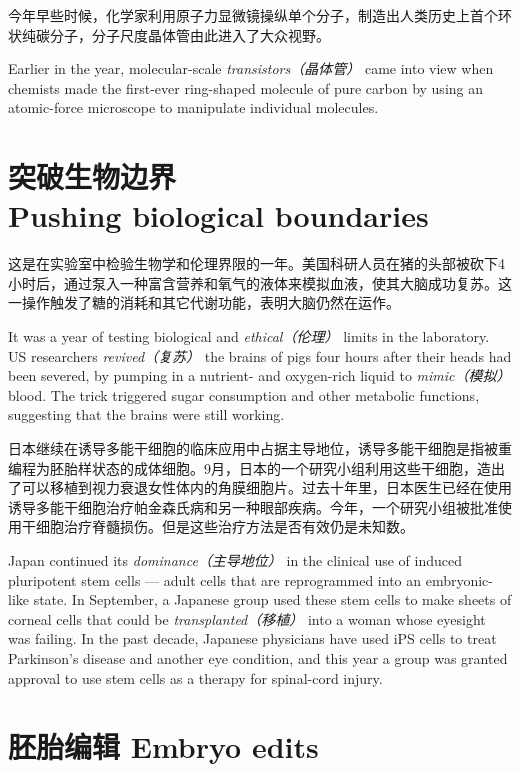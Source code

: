 \begin{multicols}{3}
今年早些时候，化学家利用原子力显微镜操纵单个分子，制造出人类历史上首个环状纯碳分子，分子尺度晶体管由此进入了大众视野。

Earlier in the year, molecular-scale \textit{transistors（晶体管）} came into view when chemists made the first-ever ring-shaped molecule of pure carbon by using an atomic-force microscope to manipulate individual molecules.


\section*{突破生物边界\\Pushing biological boundaries}

这是在实验室中检验生物学和伦理界限的一年。美国科研人员在猪的头部被砍下4小时后，通过泵入一种富含营养和氧气的液体来模拟血液，使其大脑成功复苏。这一操作触发了糖的消耗和其它代谢功能，表明大脑仍然在运作。

It was a year of testing biological and \textit{ethical（伦理）} limits in the laboratory. US researchers \textit{revived（复苏）} the brains of pigs four hours after their heads had been severed, by pumping in a nutrient- and oxygen-rich liquid to \textit{mimic（模拟）} blood. The trick triggered sugar consumption and other metabolic functions, suggesting that the brains were still working. 


日本继续在诱导多能干细胞的临床应用中占据主导地位，诱导多能干细胞是指被重编程为胚胎样状态的成体细胞。9月，日本的一个研究小组利用这些干细胞，造出了可以移植到视力衰退女性体内的角膜细胞片。过去十年里，日本医生已经在使用诱导多能干细胞治疗帕金森氏病和另一种眼部疾病。今年，一个研究小组被批准使用干细胞治疗脊髓损伤。但是这些治疗方法是否有效仍是未知数。

Japan continued its \textit{dominance（主导地位）} in the clinical use of induced pluripotent stem cells — adult cells that are reprogrammed into an embryonic-like state. In September, a Japanese group used these stem cells to make sheets of corneal cells that could be \textit{transplanted（移植）} into a woman whose eyesight was failing. In the past decade, Japanese physicians have used iPS cells to treat Parkinson's disease and another eye condition, and this year a group was granted approval to use stem cells as a therapy for spinal-cord injury.





\section*{胚胎编辑 Embryo edits}


\end{multicols}
